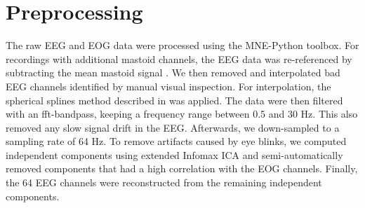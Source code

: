 \section{Preprocessing}
The raw EEG and EOG data were processed using the MNE-Python toolbox. 
For recordings with additional mastoid channels, the EEG data was re-referenced by subtracting the mean mastoid signal \cite{teplan_fundamentals_2002}.
We then removed and interpolated bad EEG channels identified by manual visual inspection.
For interpolation, the spherical splines method described in \cite{perrin_spherical_1989} was applied.
The data were then filtered with an fft-bandpass, keeping a frequency range between 0.5 and 30 Hz.
This also removed any slow signal drift in the EEG.
Afterwards, we down-sampled to a sampling rate of 64 Hz.
To remove artifacts caused by eye blinks, we computed independent components using extended Infomax \ac{ICA} \cite{lee_independent_1999} and semi-automatically removed components that had a high correlation with the EOG channels.
Finally, the 64 EEG channels were reconstructed from the remaining independent components.